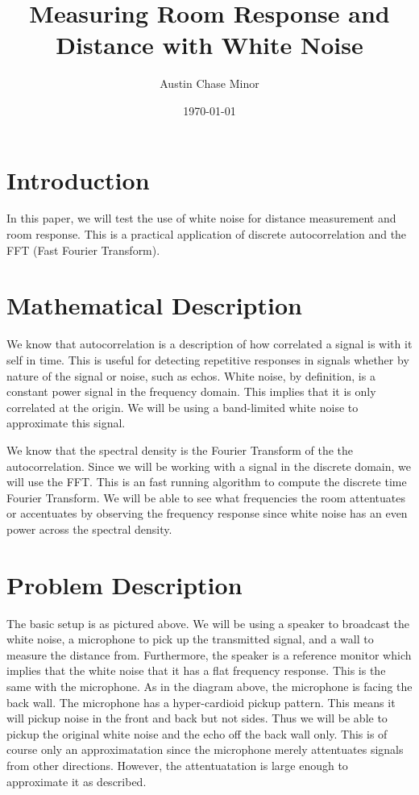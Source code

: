 \documentclass{article}
\author{Austin Chase Minor}
\title{Measuring Room Response and Distance with White Noise}
\date{\today}
\begin{document}
   \section{Introduction}
      In this paper, we will test the use of
      white noise for distance measurement and
      room response. This is a practical application
      of discrete autocorrelation and the FFT
      (Fast Fourier Transform).
   \section{Mathematical Description}
      We know that autocorrelation is a description of
      how correlated a signal is with it self in time.
      This is useful for detecting repetitive responses
      in signals whether by nature of the signal or noise,
      such as echos. White noise, by definition, is a constant
      power signal in the frequency domain. This implies that it
      is only correlated at the origin. We will be using a band-limited
      white noise to approximate this signal.

      We know that the spectral density is the Fourier Transform of the
      the autocorrelation. Since we will be working with a signal in the
      discrete domain, we will use the FFT. This is an fast running
      algorithm to compute the discrete time Fourier Transform. We will
      be able to see what frequencies the room attentuates or accentuates
      by observing the frequency response since white noise has an
      even power across the spectral density.
   \section{Problem Description}
      The basic setup is as pictured above. We will be using a speaker to
      broadcast the white noise, a microphone to pick up the transmitted signal,
      and a wall to measure the distance from. Furthermore, the speaker is
      a reference monitor which implies that the white noise that it has
      a flat frequency response. This is the same with the microphone.
      As in the diagram above, the microphone is facing the back wall. The
      microphone has a hyper-cardioid pickup pattern. This means it will
      pickup noise in the front and back but not sides. Thus we will be
      able to pickup the original white noise and the echo off the back
      wall only. This is of course only an approximatation since the microphone
      merely attentuates signals from other directions. However, the
      attentuatation is large enough to approximate it as described.
\end{document}
